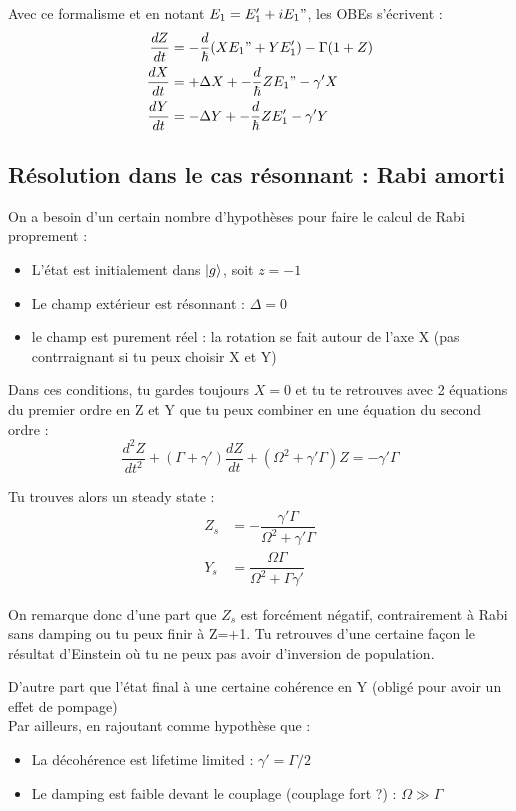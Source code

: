 \documentclass[a4paper]{report}
\begin{document}
   Avec ce formalisme et en notant $E_1=E_1'+iE_1"$, les OBEs s'écrivent : 
   \begin{align}
   \dfrac{dZ}{dt}&=-\dfrac{d}{\hbar}(XE_1"+YE_1')-\Gamma (1+Z) \\
   \dfrac{dX}{dt}&= +\Delta X +-\dfrac{d}{\hbar}ZE_1"-\gamma 'X \\
   \dfrac{dY}{dt}&= -\Delta Y +-\dfrac{d}{\hbar}ZE_1'-\gamma 'Y
   \end{align}
   
   \subsection{Résolution dans le cas résonnant : Rabi amorti}
   On a besoin d'un certain nombre d'hypothèses pour faire le calcul de Rabi proprement : \begin{itemize}
   \item L'état est initialement dans $\ket{g}$, soit $z=-1$
   \item Le champ extérieur est résonnant : $\Delta = 0$
   \item le champ est purement réel : la rotation se fait autour de l'axe X (pas contrraignant si tu peux choisir X et Y)
   \end{itemize}
   Dans ces conditions, tu gardes toujours $X=0$ et tu te retrouves avec 2 équations du premier ordre en Z et Y que tu peux combiner en une équation du second ordre : 
   \begin{equation}
   \dfrac{d^2Z}{dt^2}+(\Gamma + \gamma ')\dfrac{dZ}{dt}+(\Omega^2 + \gamma ' \Gamma)Z = -\gamma ' \Gamma
   \end{equation}
   
   Tu trouves alors un steady state : \begin{align}
   Z_s&=-\dfrac{\gamma' \Gamma}{\Omega ^2 + \gamma ' \Gamma} \\
   Y_s &= \dfrac{\Omega \Gamma}{\Omega ^2 + \Gamma \gamma '}
   \end{align}
   
   On remarque donc d'une part que $Z_s$ est forcément négatif, contrairement à Rabi sans damping ou tu peux finir à Z=+1. Tu retrouves d'une certaine façon le résultat d'Einstein où tu ne peux pas avoir d'inversion de population.
   
   D'autre part que l'état final à une certaine cohérence en Y (obligé pour avoir un effet de pompage) \\
   
   Par ailleurs, en rajoutant comme hypothèse que :\begin{itemize}
   \item La décohérence est lifetime limited : $\gamma ' = \Gamma /2$
   \item Le damping est faible devant le couplage (couplage fort ?) : $\Omega \gg \Gamma$
   \end{itemize}
   
\end{document}
